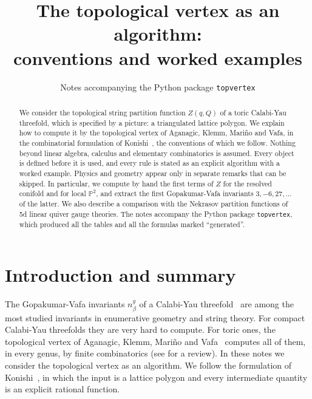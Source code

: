 \documentclass[11pt]{article}
\title{The topological vertex as an algorithm:\\ conventions and worked examples}
\author{Notes accompanying the Python package \texttt{topvertex}}
\date{}
\theoremstyle{plain}
\theoremstyle{definition}
\theoremstyle{remark}
\newcommand{\PP}{\mathbb{P}}
\newcommand{\topvertex}{\texttt{topvertex}}
\begin{document}
\maketitle

\begin{abstract}
We consider the topological string partition function $Z(q,Q)$ of a toric Calabi-Yau
threefold, which is specified by a picture: a triangulated lattice polygon. We explain how to
compute it by the topological vertex of Aganagic, Klemm, Mari\~no and Vafa, in the combinatorial
formulation of Konishi~\cite{Kon}, the conventions of which we follow. Nothing beyond linear
algebra, calculus and elementary combinatorics is assumed. Every object is defined before it is
used, and every rule is stated as an explicit algorithm with a worked example. Physics and
geometry appear only in separate remarks that can be skipped. In particular, we compute by hand
the first terms of $Z$ for the resolved conifold and for local $\PP^2$, and extract the first
Gopakumar-Vafa invariants $3,-6,27,\ldots$ of the latter. We also describe a comparison with
the Nekrasov partition functions of 5d linear quiver gauge theories. The notes accompany the
Python package \topvertex{}, which produced all the tables and all the formulas marked
``generated''.
\end{abstract}

\tableofcontents

\section{Introduction and summary}\label{sec:intro}

The Gopakumar-Vafa invariants $n^g_\beta$ of a Calabi-Yau threefold~\cite{GV} are among the most
studied invariants in enumerative geometry and string theory. For compact Calabi-Yau threefolds
they are very hard to compute. For toric ones, the topological vertex of Aganagic, Klemm,
Mari\~no and Vafa~\cite{AKMV} computes all of them, in every genus, by finite combinatorics (see
\cite{Marino} for a review). In these notes we consider the topological vertex as an algorithm.
We follow the formulation of Konishi~\cite{Kon}, in which the input is a lattice polygon and
every intermediate quantity is an explicit rational function.
\end{document}
